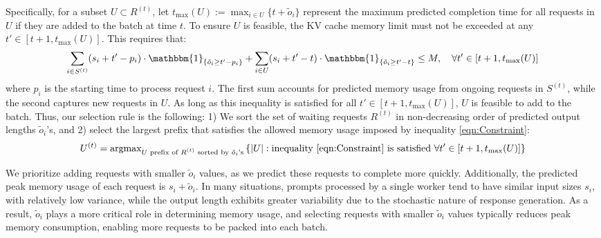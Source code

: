 \documentclass[11pt, a4paper]{article}
\theoremstyle{plain}
\theoremstyle{definition}
\theoremstyle{remark}
\newcommand{\po}{\tilde{o}}
\begin{document}
Specifically, for a subset \( U \subset R^{(t)} \), let $t_{\max}(U):= \max_{i\in U} \{ t + \po_i \}$  
represent the maximum predicted completion time for all requests in \( U \) if they are added to the batch at time \( t \). To ensure \( U \) is feasible, the KV cache memory limit must not be exceeded at any \( t' \in [t+1, t_{\max}(U)] \). This requires that:
\begin{equation}\label{eqn:Constraint}
\sum_{i\in S^{(t)}} (s_i+t'-p_i)\cdot \mathbbm{1}_{\{\po_i\geq t'-p_i\}} + \sum_{i\in U} (s_i+t'-t)\cdot \mathbbm{1}_{\{\po_i\geq t'-t\}} \leq M, \quad \forall t' \in [t+1, t_{\max}(U)]
\end{equation}
where \( p_i \) is the starting time to process request \( i \). The first sum accounts for predicted memory usage from ongoing requests in \( S^{(t)} \), while the second captures new requests in \( U \). As long as this inequality is satisfied for all \( t' \in [t+1, t_{\max}(U)] \), \( U \) is feasible to add to the batch. Thus, our selection rule is the following: 1) We sort the set of waiting requests $R^{(t)}$ in non-decreasing order of predicted output lengths $\po_i$'s, and 2) select the largest prefix that satisfies the allowed memory usage imposed by inequality \eqref{eqn:Constraint}:
%
\begin{equation}\label{eqn:Selection}
U^{(t)} = \text{argmax}_{U \textrm{ prefix of $R^{(t)}$ sorted by $\po_i$'s}} \left\{ |U| : \text{inequality \eqref{eqn:Constraint} is satisfied } 
\forall t'\in[t+1, t_{\max}(U)] \right\}
\end{equation}

We prioritize adding requests with smaller $\po_i$ values, as we predict these requests to complete more quickly. Additionally, the predicted peak memory usage of each request is $s_i + \po_i$. In many situations, prompts processed by a single worker tend to have similar input sizes $s_i$, with relatively low variance, while the output length exhibits greater variability due to the stochastic nature of response generation. As a result, $\po_i$ plays a more critical role in determining memory usage, and selecting requests with smaller $\po_i$ values typically reduces peak memory consumption, enabling more requests to be packed into each batch.
\end{document}
